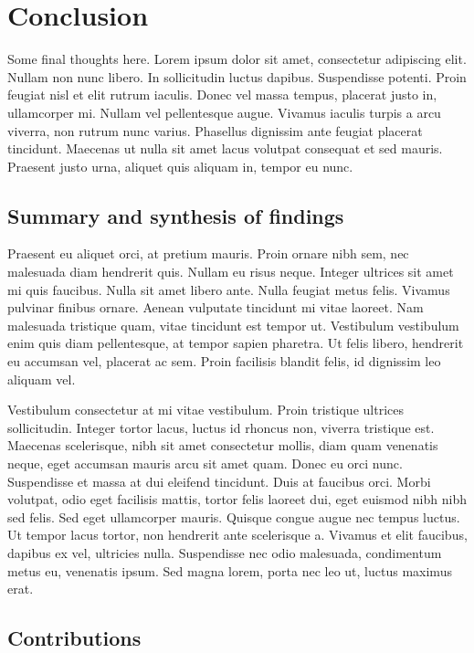 \chapter{Conclusion}

\noindent Some final thoughts here. Lorem ipsum dolor sit amet, consectetur adipiscing elit. Nullam non nunc libero. In sollicitudin luctus dapibus. Suspendisse potenti. Proin feugiat nisl et elit rutrum iaculis. Donec vel massa tempus, placerat justo in, ullamcorper mi. Nullam vel pellentesque augue. Vivamus iaculis turpis a arcu viverra, non rutrum nunc varius. Phasellus dignissim ante feugiat placerat tincidunt. Maecenas ut nulla sit amet lacus volutpat consequat et sed mauris. Praesent justo urna, aliquet quis aliquam in, tempor eu nunc. 

\section{Summary and synthesis of findings}

 Praesent eu aliquet orci, at pretium mauris. Proin ornare nibh sem, nec malesuada diam hendrerit quis. Nullam eu risus neque. Integer ultrices sit amet mi quis faucibus. Nulla sit amet libero ante. Nulla feugiat metus felis. Vivamus pulvinar finibus ornare. Aenean vulputate tincidunt mi vitae laoreet. Nam malesuada tristique quam, vitae tincidunt est tempor ut. Vestibulum vestibulum enim quis diam pellentesque, at tempor sapien pharetra. Ut felis libero, hendrerit eu accumsan vel, placerat ac sem. Proin facilisis blandit felis, id dignissim leo aliquam vel.

Vestibulum consectetur at mi vitae vestibulum. Proin tristique ultrices sollicitudin. Integer tortor lacus, luctus id rhoncus non, viverra tristique est. Maecenas scelerisque, nibh sit amet consectetur mollis, diam quam venenatis neque, eget accumsan mauris arcu sit amet quam. Donec eu orci nunc. Suspendisse et massa at dui eleifend tincidunt. Duis at faucibus orci. Morbi volutpat, odio eget facilisis mattis, tortor felis laoreet dui, eget euismod nibh nibh sed felis. Sed eget ullamcorper mauris. Quisque congue augue nec tempus luctus. Ut tempor lacus tortor, non hendrerit ante scelerisque a. Vivamus et elit faucibus, dapibus ex vel, ultricies nulla. Suspendisse nec odio malesuada, condimentum metus eu, venenatis ipsum. Sed magna lorem, porta nec leo ut, luctus maximus erat. 

\section{Contributions}

